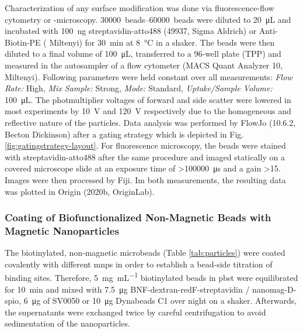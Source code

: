 Characterization of any surface modification was done via fluorescence-flow cytometry or -microscopy. \SIrange{30000}{60000}{beads} were diluted to \SI{20}{\micro\liter} and incubated with \SI{100}{\nano\gram} streptavidin-atto488 (49937, Sigma Aldrich) or Anti-Biotin-PE ( Miltenyi) for \SI{30}{\minute} at \SI{8}{\degreeCelsius} in a shaker. The beads were then diluted to a final volume of \SI{100}{\micro\liter}, transferred to a 96-well plate (TPP) and measured in the autosampler of a flow cytometer (MACS Quant Analyzer 10, Miltenyi). Following parameters were held constant over all measurements: \textit{Flow Rate:} High, \textit{Mix Sample:} Strong, \textit{Mode:} Standard, \textit{Uptake/Sample Volume:} \SI{100}{\micro\liter}. The photmultiplier voltages of forward and side scatter were lowered in most experiments by \SI{10}{\volt} and \SI{120}{\volt} respectively due to the homogeneous and reflective nature of the particles.
Data analysis was performed by FlowJo (10.6.2, Becton Dickinson) after a gating strategy which is depicted in Fig. \ref{fig:gatingstrategy-layout}. 
For fluorescence microscopy, the beads were stained with streptavidin-atto488 after the same procedure and imaged statically on a covered microscope slide at an exposure time of \SI{>100000}{\micro\second} and a gain \num{>15}. Images were then processed by Fiji. Im both measurements, the resulting data was plotted in Origin (2020b, OriginLab).



\subsubsection{Coating of Biofunctionalized Non-Magnetic Beads with Magnetic Nanoparticles}
\label{sec:meth:coatingMNPs}
The biotinylated, non-magnetic microbeads (Table \ref{tab:particles}) were coated covalently with different \glspl{mnp} in order to establish a bead-side titration of binding sites. Therefore, \SI{5}{\milli\gram\per\milli\liter} biotinylated beads in \gls{pbst} were equilibrated for \SI{10}{\minute} and mixed with \SI{7.5}{\micro\gram} BNF-dextran-redF-streptavidin / nanomag-D-spio, \SI{6}{\micro\gram} of SV0050 or \SI{10}{\micro\gram} Dynabeads C1 over night on a shaker. Afterwards, the supernatants were exchanged twice by careful centrifugation to avoid sedimentation of the nanoparticles.


